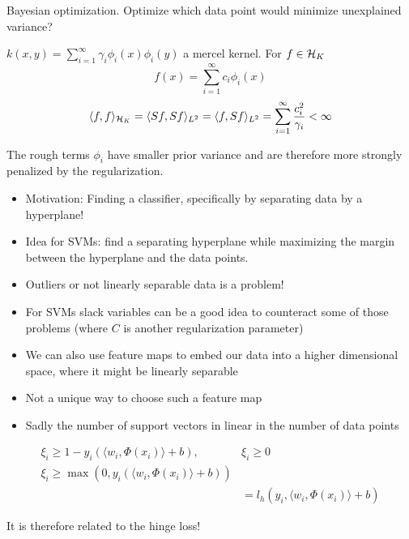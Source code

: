 \begin{aremark}
    Bayesian optimization. Optimize which data point would minimize unexplained variance?
\end{aremark}


$k(x,y)=\sum_{i=1}^\infty\gamma_i\phi_i(x)\phi_i(y)$ a mercel kernel. For $f\in \mathcal{H}_K$
\[f(x)=\sum_{i=1}^\infty c_i \phi_i(x)\]
\begin{align*}
    \langle f,f\rangle_{\mathcal{H}_K}=\langle Sf, Sf\rangle_{L^2}=\langle f,Sf\rangle_{L^2}=\sum_{i=1}^\infty \frac{c_i^2}{\gamma_i}<\infty
\end{align*}

The rough terms $\phi_i$ have smaller prior variance and are therefore more strongly penalized
by the regularization.


\begin{aremark}
    \begin{itemize}
        \item Motivation: Finding a classifier, specifically by separating data by a hyperplane!
        \item Idea for SVMs: find a separating hyperplane while maximizing the margin between the hyperplane and the data points.
        \item Outliers or not linearly separable data is a problem!
        \item For SVMs slack variables can be a good idea to counteract some of those problems (where $C$ is another regularization parameter)
        \item We can also use feature maps to embed our data into a higher dimensional space, where it might be linearly separable
        \item Not a unique way to choose such a feature map
        \item Sadly the number of support vectors in linear in the number of data points
    \end{itemize}
\end{aremark}

\begin{align*}
    \xi_i\geq 1-y_i(\langle w_i,\Phi(x_i)\rangle+b),\text{ } & \xi_i\geq 0\\
    \xi_i\geq \max(0,y_i(\langle w_i,\Phi(x_i)\rangle+b))&\\
    &=l_h(y_i,\langle w_i,\Phi(x_i)\rangle+b)
\end{align*}

It is therefore related to the hinge loss!

